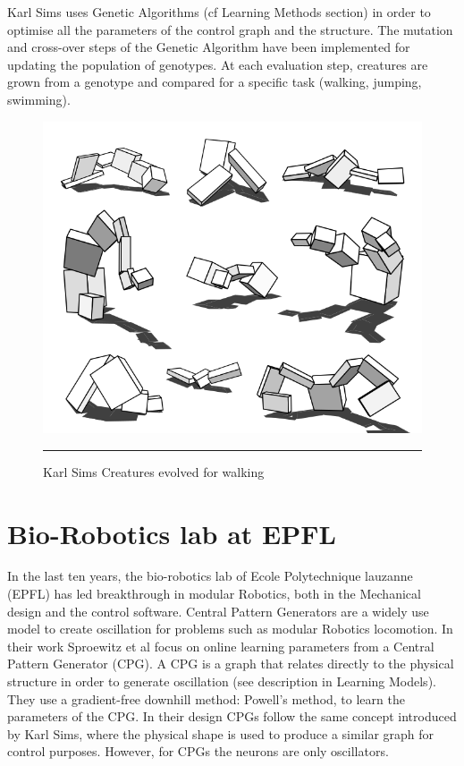 \newpage
Karl Sims uses Genetic Algorithms (cf Learning Methods section) in order to optimise all the parameters of the control graph and the structure. The mutation and cross-over steps of the Genetic Algorithm have been implemented for updating the population of genotypes. At each evaluation step, creatures are grown from a genotype and compared for a specific task (walking, jumping, swimming). 

\begin{figure}[htbp]
    \centering
    \includegraphics[scale=0.3]{Figures/evolved_creature.png}
    \rule{35em}{0.5pt}
    \caption[Karl Sims Creatures evolved for walking]{Karl Sims Creatures evolved for walking}
    \label{fig:evolved_creature}
\end{figure}


\newpage
\section{Bio-Robotics lab at EPFL}

In the last ten years, the bio-robotics lab of Ecole Polytechnique lauzanne (EPFL) has led breakthrough in modular Robotics, both in the Mechanical design and the control software. 
Central Pattern Generators are a widely use model to create oscillation for problems such as modular Robotics locomotion. In their work Sproewitz et al \cite{sproewitz} focus on online learning parameters from a Central Pattern Generator (CPG). A CPG is a graph that relates directly to the physical structure in order to generate oscillation (see description in Learning Models). They use a gradient-free downhill method: Powell's method, to learn the parameters of the CPG. In their design CPGs follow the same concept introduced by Karl Sims, where the physical shape is used to produce a similar graph for control purposes. However, for CPGs the neurons are only oscillators. 

